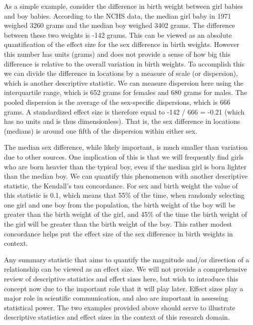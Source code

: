 As a simple example, consider the difference in birth weight between girl babies and boy babies.  According to the NCHS data, the median girl baby in 1971 weighed 3260 grams and the median boy weighed 3402 grams.  The difference between these two weights is -142 grams.  This can be viewed as an absolute quantification of the effect size for the sex difference in birth weights.  However this number has units (grams) and does not provide a sense of how big this difference is relative to the overall variation in birth weights.  To accomplish this we can divide the difference in locations by a measure of scale (or dispersion), which is another descriptive statistic.  We can measure dispersion here using the interquartile range, which is 652 grams for females and 680 grams for males.  The pooled dispersion is the average of the sex-specific dispersions, which is 666 grams.  A standardized effect size is therefore equal to -142 / 666 = -0.21 (which has no units and is thus dimensionless).  That is, the sex difference in locations (medians) is around one fifth of the dispersion within either sex.

The median sex difference, while likely important, is much smaller than variation due to other sources.  One implication of this is that we will frequently find girls who are born heavier than the typical boy, even if the median girl is born lighter than the median boy. We can quantify this phenomenon with another descriptive statistic, the Kendall's tau concordance.  For sex and birth weight the value of this statistic is 0.1, which means that 55\% of the time, when randomly selecting one girl and one boy from the population, the birth weight of the boy will be greater than the birth weight of the girl, and 45\% of the time the birth weight of the girl will be greater than the birth weight of the boy.  This rather modest concordance helps put the effect size of the sex difference in birth weights in context.

Any summary statistic that aims to quantify the magnitude and/or direction of a relationship can be viewed as an effect size.  We will not provide a comprehensive review of descriptive statistics and effect sizes here, but wish to introduce this concept now due to the important role that it will play later.  Effect sizes play a major role in scientific communication, and also are important in assessing statistical power.  The two examples provided above should serve to illustrate descriptive statistics and effect sizes in the context of this research domain.

